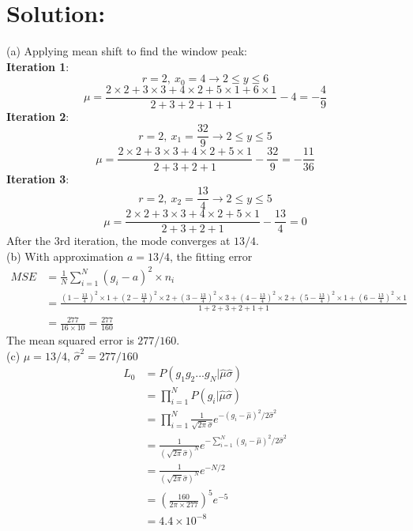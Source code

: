 \documentclass[12pt]{article}
\begin{document}
\section{Solution:}
(a) Applying mean shift to find the window peak: \\
\textbf{Iteration 1}:
\begin{equation*}
r = 2,\ x_0 = 4 \longrightarrow 2\leq y\leq6
\end{equation*}
\begin{equation*}
\mu = \frac{2\times2+3\times3+4\times2+5\times1+6\times1}{2+3+2+1+1} - 4 = -\frac{4}{9}
\end{equation*}
\textbf{Iteration 2}:
\begin{equation*}
r = 2,\ x_1 = \frac{32}{9} \longrightarrow 2\leq y\leq5
\end{equation*}
\begin{equation*}
\mu = \frac{2\times2+3\times3+4\times2+5\times1}{2+3+2+1} - \frac{32}{9} = -\frac{11}{36}
\end{equation*}
\textbf{Iteration 3}:
\begin{equation*}
r = 2,\ x_2 = \frac{13}{4} \longrightarrow 2\leq y\leq5
\end{equation*}
\begin{equation*}
\mu = \frac{2\times2+3\times3+4\times2+5\times1}{2+3+2+1} - \frac{13}{4} = 0
\end{equation*}
After the 3rd iteration, the mode converges at $13/4$.\\
(b) With approximation $a = 13/4$, the fitting error
\begin{equation*}
\begin{aligned}
MSE &= \frac{1}{N}\sum_{i=1}^N (g_i-a)^2\times n_i \\
&= \frac{(1-\frac{13}{4})^2 \times 1 + (2-\frac{13}{4})^2 \times 2 +(3-\frac{13}{4})^2 \times 3 +(4-\frac{13}{4})^2 \times 2 +(5-\frac{13}{4})^2 \times 1 + (6-\frac{13}{4})^2 \times 1}{1+2+3+2+1+1}\\
&= \frac{277}{16\times10} = \frac{277}{160}
\end{aligned}
\end{equation*}
The mean squared error is $277/160$.\\
(c) $\hat{\mu} = 13/4$, $\hat{\sigma}^2 = 277/160$
\begin{equation*}
\begin{aligned}
L_0 &= P(g_1g_2...g_N|\hat{\mu}\hat{\sigma})\\
& = \prod^N_{i=1}P(g_i|\hat{\mu}\hat{\sigma})\\
& = \prod^N_{i=1} \frac{1}{\sqrt{2\pi}\hat{\sigma}} e^{-(g_i-\hat{\mu})^2/2\hat{\sigma}^2}\\
& = \frac{1}{(\sqrt{2\pi}\hat{\sigma})^N}e^{-\sum_{i=1}^N(g_i-\hat{\mu})^2/2\hat{\sigma}^2}\\
& = \frac{1}{(\sqrt{2\pi}\hat{\sigma})^N}e^{-N/2}\\
& = \left (\frac{160}{2\pi\times277} \right )^5e^{-5}\\
& = 4.4\times 10^{-8}
\end{aligned}
\end{equation*}
\end{document}
